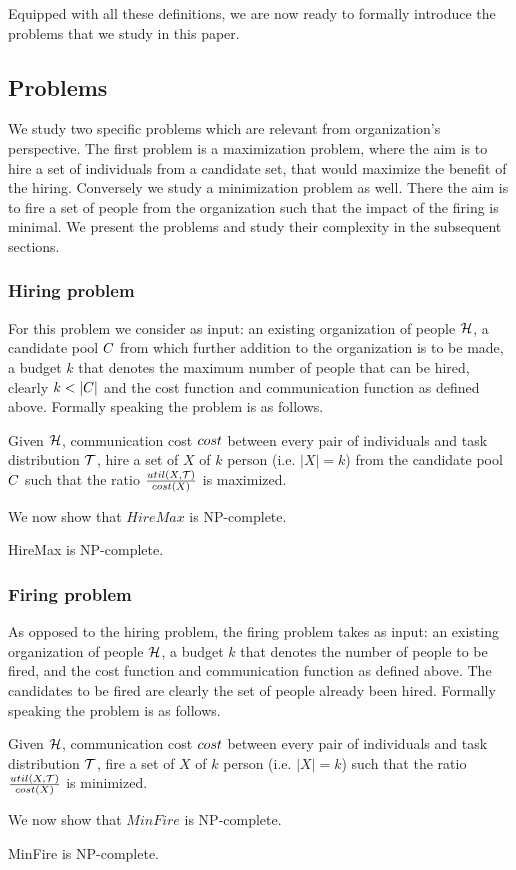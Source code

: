 Equipped with all these definitions, we are now ready to formally introduce the problems that we study in this paper.

\subsection{Problems}

We study two specific problems which are relevant from organization's perspective. The first problem is a maximization problem, where the aim is to hire a set of individuals from a candidate set, that would maximize the benefit of the hiring. Conversely we study a minimization problem as well. There the aim is to fire a set of people from the organization such that the impact of the firing is minimal. We present the problems and study their complexity in the subsequent sections.

\subsubsection{Hiring problem}

For this problem we consider as input: an existing organization of people $\mathcal{H}$, a candidate pool ${C}$ from which further addition to the organization is to be made, a budget $k$ that denotes the maximum number of people that can be hired, clearly $k < |{C}|$ and the cost function and communication function as defined above. Formally speaking the problem is as follows.  
\begin{problem}
[HireMax] Given $\mathcal{H}$, communication cost $cost$ between every pair of individuals and task distribution $\mathcal{T}$, hire a set of $X$ of $k$ person (i.e. $|X| = k$) from the candidate pool ${C}$ such that the ratio $\frac{{util}(X, \mathcal{T})}{cost(X)}$ is maximized.
\end{problem}

We now show that $HireMax$ is NP-complete.
\begin{theorem}
HireMax is NP-complete.
\end{theorem}



\subsubsection{Firing problem}

As opposed to the hiring problem, the firing problem takes as input: an existing organization of people $\mathcal{H}$, a budget $k$ that denotes the number of people to be fired, and the cost function and communication function as defined above. The candidates to be fired are clearly the set of people already been hired. Formally speaking the problem is as follows.  
\begin{problem}
[MinFire] Given $\mathcal{H}$, communication cost $cost$ between every pair of individuals and task distribution $\mathcal{T}$, fire a set of $X$ of $k$ person (i.e. $|X| = k$) such that the ratio $\frac{{util}(X, \mathcal{T})}{cost(X)}$ is minimized.
\end{problem}

We now show that $MinFire$ is NP-complete.
\begin{theorem}
MinFire is NP-complete.
\end{theorem}
